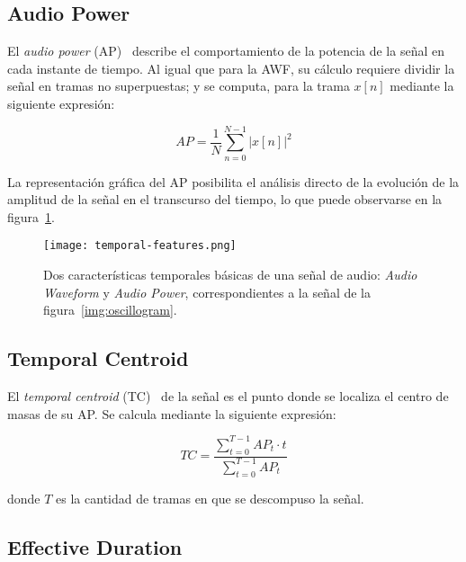 \subsection{Audio Power}\label{subsec:audioPower}

El \textit{audio power} (AP)~\cite{Kim05,Manjunath02} describe el comportamiento de la potencia de la señal en cada instante de tiempo.
Al igual que para la AWF, su cálculo requiere dividir la señal en tramas no superpuestas;
y se computa, para la trama $x[n]$ mediante la siguiente expresión:

\begin{equation}
    \label{eq:AP}
    AP = \frac{1}{N}\sum_{n=0}^{N-1}{|x[n]|^2}
\end{equation}

La representación gráfica del AP posibilita el análisis directo de la evolución de la amplitud de la señal en el transcurso del tiempo, lo que puede observarse en la figura~\ref{img:awf+ap}.

\begin{figure}[!h]
    \centering
    \texttt{[image: temporal-features.png]}
    \caption{Dos características temporales básicas de una señal de audio: \textit{Audio Waveform} y \textit{Audio Power}, correspondientes a la señal de la figura~\ref{img:oscillogram}.}
    \label{img:awf+ap}
\end{figure}

\subsection{Temporal Centroid}\label{subsec:temporalCentroid}

El \textit{temporal centroid} (TC)~\cite{Kim05,Manjunath02,Peters04,Zamanian17} de la señal es el punto donde se localiza el centro de masas de su AP\@.
Se calcula mediante la siguiente expresión:

\begin{equation}
    \label{eq:TC}
    TC = \frac{\sum_{t=0}^{T-1}{AP_t \cdot t}}{\sum_{t=0}^{T-1}{AP_t}}
\end{equation}

\noindent
donde $T$ es la cantidad de tramas en que se descompuso la señal.

\subsection{Effective Duration}\label{subsec:effectiveDuration}

